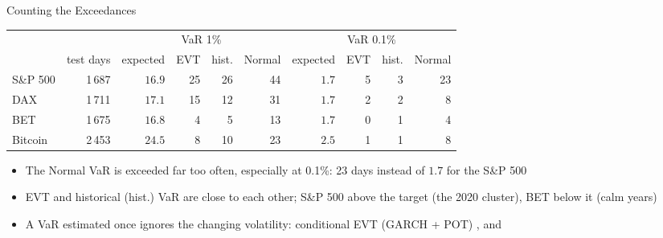 \begin{frame}{Counting the Exceedances}
\itemsize{\footnotesize}
\begin{center}
\scriptsize
\begin{tabular}{lr|rrrr|rrrr}
\toprule
& & \multicolumn{4}{c|}{VaR 1\%} & \multicolumn{4}{c}{VaR 0.1\%} \\ & test days & expected & EVT & hist. & Normal & expected & EVT & hist. & Normal \\
\midrule
S\&P 500 & 1\,687 & $16.9$ & 25 & 26 & 44 & $1.7$ & 5 & 3 & 23 \\
DAX & 1\,711 & $17.1$ & 15 & 12 & 31 & $1.7$ & 2 & 2 & 8 \\
BET & 1\,675 & $16.8$ & 4 & 5 & 13 & $1.7$ & 0 & 1 & 4 \\
Bitcoin & 2\,453 & $24.5$ & 8 & 10 & 23 & $2.5$ & 1 & 1 & 8 \\
\bottomrule
\end{tabular}
\end{center}
\begin{itemize}
    \item The Normal VaR is exceeded far too often, especially at 0.1\%: 23 days instead of $1.7$ for the S\&P 500
    \item EVT and historical (hist.) VaR are close to each other; S\&P 500 above the target (the 2020 cluster), BET below it (calm years)
    \item A VaR estimated once ignores the changing volatility: conditional EVT (GARCH + POT) ,  and 
\end{itemize}
\end{frame}

